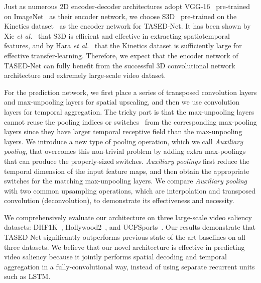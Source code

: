 \documentclass[10pt,twocolumn,letterpaper]{article}
\newcommand{\modelname}{TASED-Net}
\newcommand{\auxpnamet}{Auxiliary pooling}
\newcommand{\auxpname}{\textit{\auxpnamet}}
\begin{document}
Just as numerous 2D encoder-decoder architectures adopt VGG-16~\cite{simonyan2014very} pre-trained on ImageNet~\cite{deng2009imagenet} as their encoder network, we choose S3D~\cite{xie2018rethinking} pre-trained on the Kinetics dataset~\cite{kay2017kinetics} as the encoder network for \modelname{}. It has been shown by Xie \textit{et al.}~\cite{xie2018rethinking} that S3D is efficient and effective in extracting spatiotemporal features, and by Hara \textit{et al.}~\cite{hara2018can} that the Kinetics dataset is sufficiently large for effective transfer-learning. Therefore, we expect that the encoder network of \modelname{} can fully benefit from the successful 3D convolutional network architecture and extremely large-scale video dataset.

For the prediction network, we first place a series of transposed convolution layers and max-unpooling layers for spatial upscaling, and then we use convolution layers for temporal aggregation. The tricky part is that the max-unpooling layers cannot reuse the pooling indices or switches~\cite{zeiler2011adaptive} from the corresponding max-pooling layers since they have larger temporal receptive field than the max-unpooling layers. We introduce a new type of pooling operation, which we call \auxpname{}, that overcomes this non-trivial problem by adding extra max-poolings that can produce the properly-sized switches. \auxpname{\textit{s}} first reduce the temporal dimension of the input feature maps, and then obtain the appropriate switches for the matching max-unpooling layers. We compare \auxpname{} with two common upsampling operations, which are interpolation and transposed convolution (deconvolution), to demonstrate its effectiveness and necessity.

We comprehensively evaluate our architecture on three large-scale video saliency datasets: DHF1K~\cite{wang2018revisiting}, Hollywood2~\cite{marszalek2009actions, mathe2015actions}, and UCFSports~\cite{mathe2015actions, rodriguez2008action, soomro2014action}. Our results demonstrate that \modelname{} significantly outperforms previous state-of-the-art baselines on all three datasets. We believe that our novel architecture is effective in predicting video saliency because it jointly performs spatial decoding and temporal aggregation in a fully-convolutional way, instead of using separate recurrent units such as LSTM.
\end{document}
